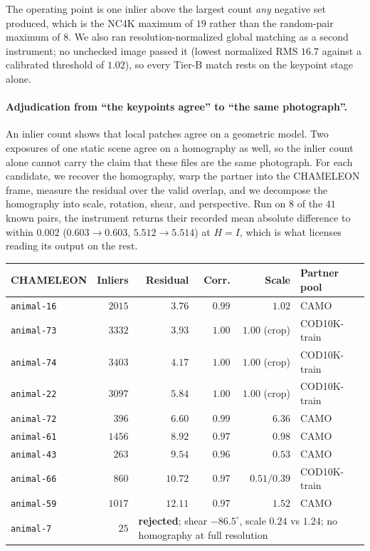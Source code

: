 \documentclass{article}
\begin{document}
The operating point is one inlier above the largest count \emph{any} negative set produced, which is
the NC4K maximum of $19$ rather than the random-pair maximum of $8$. We also ran resolution-normalized
global matching as a second instrument; no unchecked image passed it (lowest normalized RMS $16.7$
against a calibrated threshold of $1.02$), so every Tier-B match rests on the keypoint stage alone.

\paragraph{Adjudication from ``the keypoints agree'' to ``the same photograph''.} An inlier count
shows that local patches agree on a geometric model. Two exposures of one static scene agree on a
homography as well, so the inlier count alone cannot carry the claim that these files are the same
photograph. For each candidate, we recover the homography, warp the partner into the CHAMELEON frame, measure the residual over the valid overlap, and we decompose the homography into scale,
rotation, shear, and perspective. Run on $8$ of the $41$ known pairs, the instrument returns their
recorded mean absolute difference to within $0.002$ ($0.603 \to 0.603$, $5.512 \to 5.514$) at
$H = I$, which is what licenses reading its output on the rest.

\begin{center}\small
\setlength{\tabcolsep}{4pt}
\begin{tabular}{lrrrrl}
\toprule
CHAMELEON & Inliers & Residual & Corr. & Scale & Partner pool \\
\midrule
\texttt{animal-16} & $2015$ & $3.76$ & $0.99$ & $1.02$ & CAMO \\
\texttt{animal-73} & $3332$ & $3.93$ & $1.00$ & $1.00$ (crop) & COD10K-train \\
\texttt{animal-74} & $3403$ & $4.17$ & $1.00$ & $1.00$ (crop) & COD10K-train \\
\texttt{animal-22} & $3097$ & $5.84$ & $1.00$ & $1.00$ (crop) & COD10K-train \\
\texttt{animal-72} & $396$ & $6.60$ & $0.99$ & $6.36$ & CAMO \\
\texttt{animal-61} & $1456$ & $8.92$ & $0.97$ & $0.98$ & CAMO \\
\texttt{animal-43} & $263$ & $9.54$ & $0.96$ & $0.53$ & CAMO \\
\texttt{animal-66} & $860$ & $10.72$ & $0.97$ & $0.51/0.39$ & COD10K-train \\
\texttt{animal-59} & $1017$ & $12.11$ & $0.97$ & $1.52$ & CAMO \\
\midrule
\texttt{animal-7} & $25$ & \multicolumn{4}{l}{\textbf{rejected}; shear $-86.5^\circ$, scale $0.24$ vs $1.24$; no homography at full resolution} \\
\bottomrule
\end{tabular}
\end{center}
\end{document}
